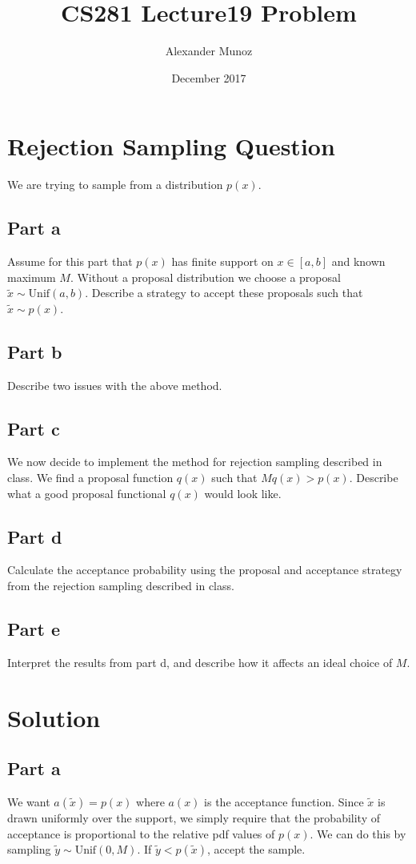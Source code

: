 \documentclass{article}
\title{CS281 Lecture19 Problem}
\author{Alexander Munoz}
\date{December 2017}
\begin{document}
\maketitle

\section{Rejection Sampling Question}
We are trying to sample from a distribution $p(x)$.
\subsection{Part a}
Assume for this part that $p(x)$ has finite support on $x\in[a,b]$ and known maximum $M$. Without a proposal distribution we choose a proposal $\tilde{x}\sim\text{Unif}(a,b)$. Describe a strategy to accept these proposals such that $\tilde{x}\sim p(x)$.
\subsection{Part b}
Describe two issues with the above method.
\subsection{Part c}
We now decide to implement the method for rejection sampling described in class. We find a proposal function $q(x)$ such that $Mq(x)>p(x)$. Describe what a good proposal functional $q(x)$ would look like.
\subsection{Part d}
Calculate the acceptance probability using the proposal and acceptance strategy from the rejection sampling described in class.
\subsection{Part e}
Interpret the results from part d, and describe how it affects an ideal choice of $M$.



\section{Solution}
\subsection{Part a}
We want $a(\tilde{x})=p(x)$ where $a(x)$ is the acceptance function. Since $\tilde{x}$ is drawn uniformly over the support, we simply require that the probability of acceptance is proportional to the relative pdf values of $p(x)$. We can do this by sampling $\tilde{y}\sim\text{Unif}(0,M)$. If $\tilde{y}<p(\tilde{x})$, accept the sample. 
\end{document}
